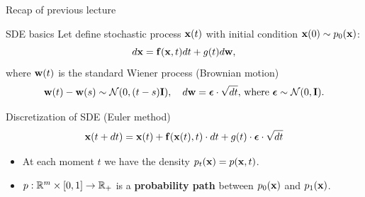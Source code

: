 

\usepackage{tikz}

\usetikzlibrary{arrows,shapes,positioning,shadows,trees}

\begin{frame}
\titlepage
\end{frame}
\begin{frame}{Recap of previous lecture}
	\vspace{-0.2cm}
	\begin{block}{SDE basics}
		Let define stochastic process $\mathbf{x}(t)$ with initial condition $\mathbf{x}(0) \sim p_0(\mathbf{x})$:
		\[
			d\mathbf{x} = \mathbf{f}(\mathbf{x}, t) dt + g(t) d \mathbf{w}, 
		\]
		where $\mathbf{w}(t)$ is the standard Wiener process (Brownian motion)
		\vspace{-0.2cm}
		\[		
			\mathbf{w}(t) - \mathbf{w}(s) \sim \mathcal{N}(0, (t - s) \mathbf{I}), \quad d \mathbf{w} = \boldsymbol{\epsilon} \cdot \sqrt{dt}, \, \text{where } \boldsymbol{\epsilon} \sim \mathcal{N}(0, \mathbf{I}).
		\]
	\end{block}
	\vspace{-0.3cm}
	\begin{block}{Discretization of SDE (Euler method)}
		\vspace{-0.3cm}
		\[
			\mathbf{x}(t + dt) = \mathbf{x}(t) + \mathbf{f}(\mathbf{x}(t), t) \cdot dt + g(t) \cdot \boldsymbol{\epsilon} \cdot \sqrt{dt}
		\]
		\vspace{-0.3cm}
	\end{block}
	\begin{itemize}
		\item At each moment $t$ we have the density $p_t(\mathbf{x}) = p(\mathbf{x}, t)$.
		\item $p: \mathbb{R}^m \times [0, 1] \rightarrow \mathbb{R}_+$ is a \textbf{probability path} between $p_0(\mathbf{x})$ and $p_1(\mathbf{x})$.
	\end{itemize}
\end{frame}
